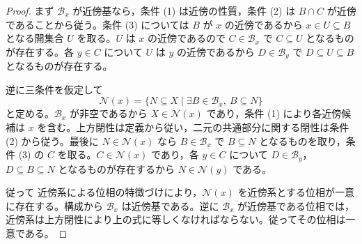 \documentclass[a5paper,10pt,dvipdfmx]{jsarticle}
\theoremstyle{definition}
\theoremstyle{plain}
\newcommand{\GenronRefText}[2]{#2}
\begin{document}
\begin{proof}
まず $\mathcal B_x$ が近傍基なら，条件 (1) は近傍の性質，条件 (2) は $B\cap C$ が近傍であることから従う。条件 (3) については $B$ が $x$ の近傍であるから $x\in U\subseteq B$ となる開集合 $U$ を取る。$U$ は $x$ の近傍であるので $C\in\mathcal B_x$ で $C\subseteq U$ となるものが存在する。各 $y\in C$ について $U$ は $y$ の近傍であるから $D\in\mathcal B_y$ で $D\subseteq U\subseteq B$ となるものが存在する。

逆に三条件を仮定して
\[
 \mathcal N(x)=\{N\subseteq X\mid
       \exists B\in\mathcal B_x,\ B\subseteq N\}
\]
と定める。$\mathcal B_x$ が非空であるから $X\in\mathcal N(x)$ であり，条件 (1) により各近傍候補は $x$ を含む。上方閉性は定義から従い，二元の共通部分に関する閉性は条件 (2) から従う。最後に $N\in\mathcal N(x)$ なら $B\in\mathcal B_x$ で $B\subseteq N$ となるものを取り，条件 (3) の $C$ を取る。$C\in\mathcal N(x)$ であり，各 $y\in C$ について $D\in\mathcal B_y$，$D\subseteq B\subseteq N$ となるものが存在するから $N\in\mathcal N(y)$ である。

従って \GenronRefText{K-000197}{近傍系による位相の特徴づけ}により，$\mathcal N(x)$ を近傍系とする位相が一意に存在する。構成から $\mathcal B_x$ は近傍基である。逆に $\mathcal B_x$ が近傍基である位相では，近傍系は上方閉性により上の式に等しくなければならない。従ってその位相は一意である。
\end{proof}
\par\medskip{}
\end{document}
